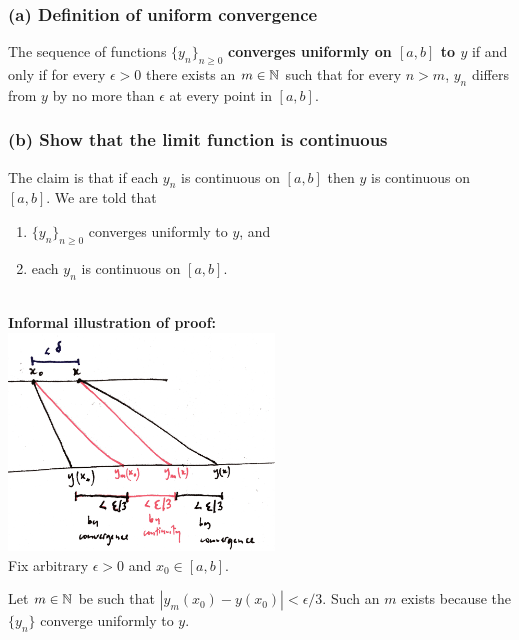 \documentclass[12pt]{article}
\begin{document}
\begin{mdframed}
  \subsubsection*{(a) Definition of uniform convergence}
  The sequence of functions $\{y_n\}_{n\geq 0}$ \textbf{converges uniformly on
    $[a, b]$ to $y$} if and only if for every $\epsilon > 0$ there exists an
  $m \in \mathbb{N}$ such that for every $n > m$, $y_n$ differs from $y$ by no more
  than $\epsilon$ at every point in $[a,b]$.

  \subsubsection*{(b) Show that the limit function is continuous}

  The claim is that if each $y_n$ is continuous on $[a,b]$ then $y$ is
  continuous on $[a,b]$. We are told that
  \begin{enumerate}
  \item $\{y_n\}_{n \geq 0}$ converges uniformly to $y$, and
  \item each $y_n$ is continuous on $[a,b]$.
  \end{enumerate}
  ~\\
  \textbf{Informal illustration of proof:}\\
  \includegraphics[width=200pt]{img/differential-equations-a1-1-1-a-diagram.png}\\


  Fix arbitrary $\epsilon > 0$ and $x_0 \in [a,b]$.

  Let $m \in \mathbb{N}$ be such that $|y_m(x_0) - y(x_0)| < \epsilon/3$. Such an $m$
  exists because the $\{y_n\}$ converge uniformly to $y$.


\end{mdframed}
\end{document}
